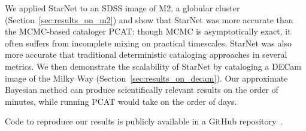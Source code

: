 We applied StarNet to an SDSS image of M2, a globular cluster (Section~\ref{sec:results_on_m2})
and show that
StarNet was more accurate than the MCMC-based cataloger PCAT: though MCMC is asymptotically exact, it often suffers from incomplete mixing on practical timescales.
StarNet was also more accurate that traditional deterministic cataloging approaches in several metrics.
We then demonstrate the scalability of StarNet by cataloging a DECam image of the Milky Way (Section~\ref{sec:results_on_decam}).
Our approximate Bayesian method can produce scientifically relevant results on the order of minutes, while running PCAT would take on the order of days.


Code to reproduce our results is publicly available in a GitHub repository~\citep{BLISS2023}.


















